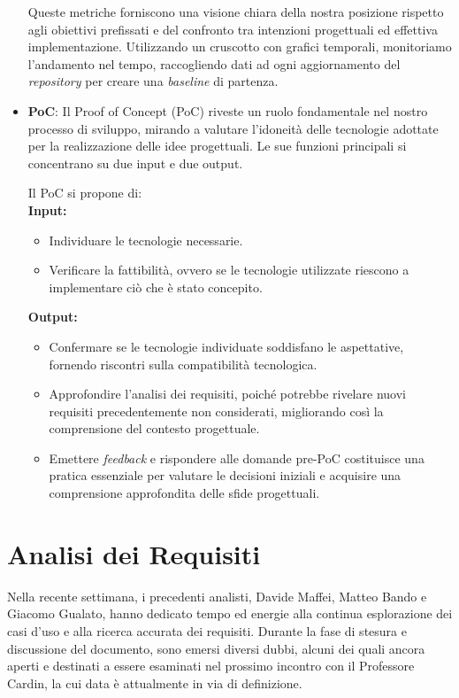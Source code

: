 \begin{itemize}
	      Queste metriche forniscono una visione chiara della nostra posizione rispetto agli obiettivi prefissati e del
	      confronto tra intenzioni progettuali ed effettiva implementazione.
	      Utilizzando un cruscotto con grafici temporali, monitoriamo l'andamento nel tempo, raccogliendo dati ad ogni
	      aggiornamento del \textit{repository} per creare una \textit{baseline} di partenza.


	\item 	\textbf{PoC}:
	      Il Proof of Concept (PoC) riveste un ruolo fondamentale nel nostro processo di sviluppo,
	      mirando a valutare l'idoneità delle tecnologie adottate per la realizzazione delle idee progettuali.
	      Le sue funzioni principali si concentrano su due input e due output.

	      Il PoC si propone di: \\
	      \textbf{Input:}
	      \begin{itemize}
		      \item Individuare le tecnologie necessarie.
		      \item Verificare la fattibilità, ovvero se le tecnologie utilizzate riescono a implementare ciò che è stato concepito.
	      \end{itemize}

	      \textbf{Output:}
	      \begin{itemize}
		      \item Confermare se le tecnologie individuate soddisfano le aspettative, fornendo riscontri sulla compatibilità tecnologica.
		      \item Approfondire l'analisi dei requisiti, poiché potrebbe rivelare nuovi requisiti precedentemente non considerati,
		            migliorando così la comprensione del contesto progettuale.
		      \item Emettere \textit{feedback} e rispondere alle domande pre-PoC costituisce una pratica essenziale per valutare le decisioni
		            iniziali e acquisire una comprensione approfondita delle sfide progettuali.
	      \end{itemize}
\end{itemize}

\section{Analisi dei Requisiti}

Nella recente settimana, i precedenti analisti, Davide Maffei, Matteo Bando e Giacomo Gualato,
hanno dedicato tempo ed energie alla continua esplorazione dei casi d'uso e alla ricerca accurata dei requisiti.
Durante la fase di stesura e discussione del documento, sono emersi diversi dubbi,
alcuni dei quali ancora aperti e destinati a essere esaminati nel prossimo incontro con il Professore Cardin,
la cui data è attualmente in via di definizione.

